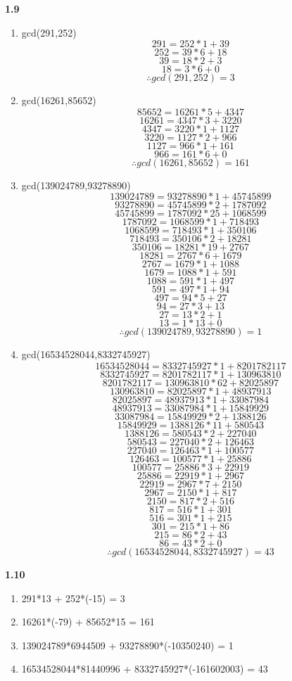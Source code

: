 \documentclass[a4paper, 11pt]{article}
\begin{document}
\noindent \textbf{1.9}
\begin{enumerate}[label=(\alph*)]
    \item gcd(291,252)\\
        $$291 = 252*1 + 39$$
        $$252 = 39*6 + 18$$
        $$39 = 18*2 + 3$$
        $$18 = 3*6 + 0$$
        $$\therefore gcd(291,252)=3$$
    \item gcd(16261,85652)\\
        $$85652 = 16261*5 + 4347$$
        $$16261 = 4347*3 + 3220$$
        $$4347 = 3220*1 + 1127$$
        $$3220 = 1127*2 + 966$$
        $$1127 = 966*1 + 161$$
        $$966 = 161*6 + 0$$
        $$\therefore gcd(16261,85652)=161$$
    \item gcd(139024789,93278890)
        $$139024789 = 93278890*1 + 45745899$$
        $$93278890 = 45745899*2 + 1787092$$
        $$45745899 = 1787092*25 + 1068599$$
        $$1787092 = 1068599*1 + 718493$$
        $$1068599 = 718493*1 + 350106$$
        $$718493 = 350106*2 + 18281$$
        $$350106 = 18281*19 + 2767$$
        $$18281 = 2767*6 + 1679$$
        $$2767 = 1679*1 + 1088$$
        $$1679 = 1088*1 + 591$$
        $$1088 = 591*1 + 497$$
        $$591 = 497*1 + 94$$
        $$497 = 94*5 + 27$$
        $$94 = 27*3 + 13$$
        $$27 = 13*2 + 1$$
        $$13 = 1*13 + 0$$
        $$\therefore gcd(139024789,93278890)=1$$
    \item gcd(16534528044,8332745927)
        $$16534528044 = 8332745927*1 + 8201782117$$
        $$8332745927 = 8201782117*1 + 130963810$$
        $$8201782117 = 130963810*62 + 82025897$$
        $$130963810 = 82025897*1 + 48937913$$
        $$82025897 = 48937913*1 + 33087984$$
        $$48937913 = 33087984*1 + 15849929$$
        $$33087984 = 15849929*2 + 1388126$$
        $$15849929 = 1388126*11 + 580543$$
        $$1388126 = 580543*2 + 227040$$
        $$580543 = 227040*2 + 126463$$
        $$227040 = 126463*1 + 100577$$
        $$126463 = 100577*1 + 25886$$
        $$100577 = 25886*3 + 22919$$
        $$25886 = 22919*1 + 2967$$
        $$22919 = 2967*7 + 2150$$
        $$2967 = 2150*1 + 817$$
        $$2150 = 817*2 + 516$$
        $$817 = 516*1 + 301$$
        $$516 = 301*1 + 215$$
        $$301 = 215*1 + 86$$
        $$215 = 86*2 + 43$$
        $$86 = 43*2 + 0$$
        $$\therefore gcd(16534528044,8332745927)=43$$
\end{enumerate}

\noindent \textbf{1.10}
\begin{enumerate}[label=(\alph*)]
    \item 291*13 + 252*(-15) = 3
    \item 16261*(-79) + 85652*15 = 161
    \item 139024789*6944509 + 93278890*(-10350240) = 1
    \item 16534528044*81440996 + 8332745927*(-161602003) = 43
\end{enumerate}
\end{document}
